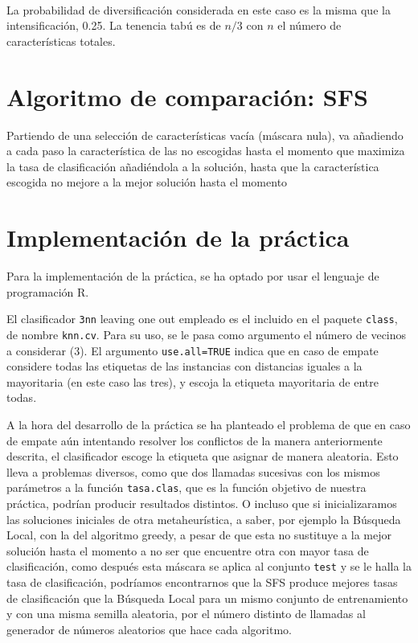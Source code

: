 \documentclass[a4paper,11pt]{article}
\begin{document}
\small{\texttt{}}
\normalsize\\

La probabilidad de diversificación considerada en este caso es la misma que la intensificación, 0.25.
La tenencia tabú es de $n/3$ con $n$ el número de características totales.

\section{Algoritmo de comparación: SFS}
\small{\texttt{}}

Partiendo de una selección de características vacía (máscara nula), va añadiendo a cada paso la característica
de las no escogidas hasta el momento que maximiza la tasa de clasificación añadiéndola a la solución, hasta
que la característica escogida no mejore a la mejor solución hasta el momento

\section{Implementación de la práctica}
Para la implementación de la práctica, se ha optado por usar el lenguaje de programación R. 

El clasificador \texttt{3nn} leaving one out empleado es el incluido en el paquete \texttt{class}, de nombre
\texttt{knn.cv}. Para su uso, se le pasa como argumento el número de vecinos a considerar (3). El argumento 
\texttt{use.all=TRUE} indica que en caso de empate considere todas las etiquetas de las instancias con distancias 
iguales a la mayoritaria (en este caso las tres), y escoja la etiqueta mayoritaria de entre todas. 

A la hora del desarrollo de la práctica se ha planteado el problema de que en caso de empate aún intentando 
resolver los conflictos de la manera anteriormente descrita, el clasificador escoge la etiqueta que
asignar de manera aleatoria. Esto lleva a problemas diversos, como que dos llamadas sucesivas con los mismos
parámetros a la función \texttt{tasa.clas}, que es la función objetivo de nuestra práctica, podrían producir resultados 
distintos. O incluso que si inicializaramos las soluciones iniciales de otra metaheurística, a saber, por ejemplo la
Búsqueda Local, con la del algoritmo greedy, a pesar de que esta no sustituye a la mejor solución hasta el momento a 
no ser que encuentre otra con mayor tasa de clasificación, como después esta máscara se aplica al conjunto 
\texttt{test} y se le halla la tasa de clasificación, podríamos encontrarnos que la SFS produce mejores tasas
de clasificación que la Búsqueda Local para un mismo conjunto de entrenamiento y con una misma semilla aleatoria, por
el número distinto de llamadas al generador de números aleatorios que hace cada algoritmo.
\end{document}
